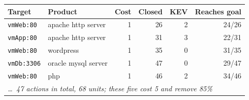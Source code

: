 \begin{tabular}{llrrrr}
\toprule
Target & Product & Cost & Closed & KEV & Reaches goal \\
\midrule
\texttt{vmWeb:80} & apache http server & 1 & 26 & 2 & 24/26 \\
\texttt{vmApp:80} & apache http server & 1 & 31 & 3 & 22/31 \\
\texttt{vmWeb:80} & wordpress & 1 & 35 & 0 & 31/35 \\
\texttt{vmDb:3306} & oracle mysql server & 1 & 47 & 0 & 29/47 \\
\texttt{vmWeb:80} & php & 1 & 46 & 2 & 34/46 \\
\midrule
\multicolumn{6}{l}{\emph{\ldots\ 47 actions in total, 68 units; these five cost 5 and remove 85\%}} \\
\bottomrule
\end{tabular}
